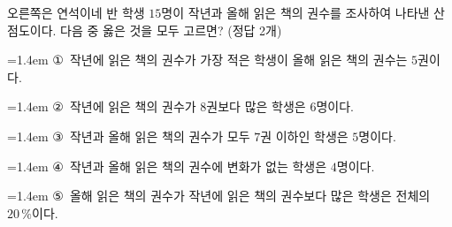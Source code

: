 \noindent\begin{minipage}[t]{0.58\linewidth}\vspace{0pt}\raggedright 오른쪽은 연석이네 반 학생 $15$명이 작년과 올해 읽은 책의 권수를 조사하여 나타낸 산점도이다. 다음 중 옳은 것을 모두 고르면? (정답 2개)\end{minipage}\hfill\begin{minipage}[t]{0.4\linewidth}\vspace{0pt}\centering \resizebox{\ifdim\width>\linewidth\linewidth\else\width\fi}{!}{}\end{minipage}\par
\par\medskip\par\noindent\hangindent=1.4em {\small ①}\ 작년에 읽은 책의 권수가 가장 적은 학생이 올해 읽은 책의 권수는 $5$권이다.\par\noindent\hangindent=1.4em {\small ②}\ 작년에 읽은 책의 권수가 $8$권보다 많은 학생은 $6$명이다.\par\noindent\hangindent=1.4em {\small ③}\ 작년과 올해 읽은 책의 권수가 모두 $7$권 이하인 학생은 $5$명이다.\par\noindent\hangindent=1.4em {\small ④}\ 작년과 올해 읽은 책의 권수에 변화가 없는 학생은 $4$명이다.\par\noindent\hangindent=1.4em {\small ⑤}\ 올해 읽은 책의 권수가 작년에 읽은 책의 권수보다 많은 학생은 전체의 $20\,\%$이다.\par\medskip
